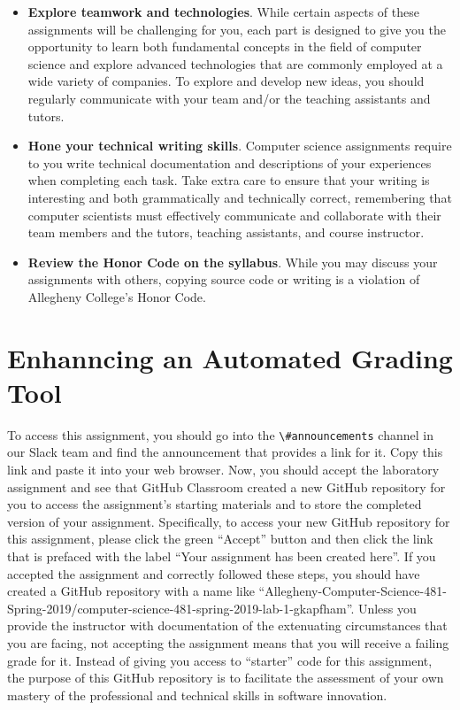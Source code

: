 \documentclass[11pt]{article}
\newcommand{\channel}[1]{\lstinline{#1}}
\begin{document}
\begin{itemize}
\item {\bf Explore teamwork and technologies}. While certain aspects of these
  assignments will be challenging for you, each part is designed to give you the
  opportunity to learn both fundamental concepts in the field of computer
  science and explore advanced technologies that are commonly employed at a wide
  variety of companies. To explore and develop new ideas, you should regularly
  communicate with your team and/or the teaching assistants and tutors.

\item {\bf Hone your technical writing skills}. Computer science assignments
  require to you write technical documentation and descriptions of your
  experiences when completing each task. Take extra care to ensure that your
  writing is interesting and both grammatically and technically correct,
  remembering that computer scientists must effectively communicate and
  collaborate with their team members and the tutors, teaching assistants, and
  course instructor.

\item {\bf Review the Honor Code on the syllabus}. While you may discuss your
  assignments with others, copying source code or writing is a violation of
  Allegheny College's Honor Code.

\end{itemize}

\section*{Enhanncing an Automated Grading Tool}


To access this assignment, you should go into the \channel{\#announcements}
channel in our Slack team and find the announcement that provides a link for it.
Copy this link and paste it into your web browser. Now, you should accept the
laboratory assignment and see that GitHub Classroom created a new GitHub
repository for you to access the assignment's starting materials and to store
the completed version of your assignment. Specifically, to access your new
GitHub repository for this assignment, please click the green ``Accept'' button
and then click the link that is prefaced with the label ``Your assignment has
been created here''. If you accepted the assignment and correctly followed these
steps, you should have created a GitHub repository with a name like
``Allegheny-Computer-Science-481-Spring-2019/computer-science-481-spring-2019-lab-1-gkapfham''.
Unless you provide the instructor with documentation of the extenuating
circumstances that you are facing, not accepting the assignment means that you
will receive a failing grade for it.
%
Instead of giving you access to ``starter'' code for this assignment, the
purpose of this GitHub repository is to facilitate the assessment of your own
mastery of the professional and technical skills in software innovation.
\end{document}
